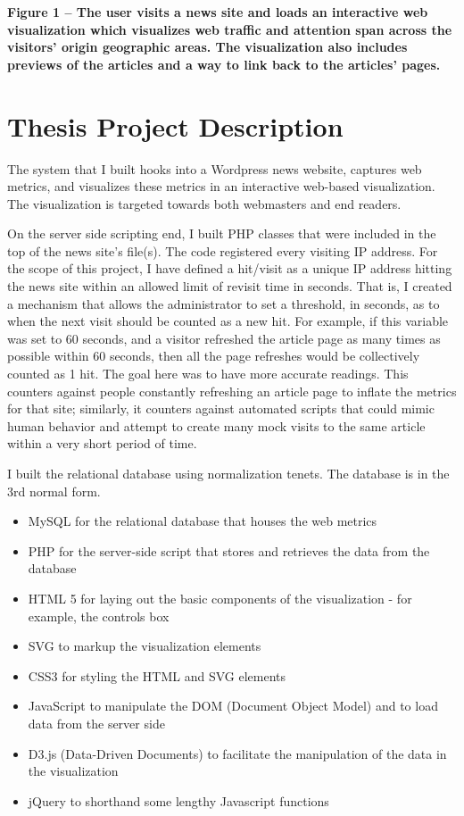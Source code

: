 \documentclass[12pt]{article}
\begin{document}
\noindent\textbf{Figure 1 -- The user visits a news site and loads an interactive web visualization which visualizes web traffic and attention span across the visitors' origin geographic areas. The visualization also includes previews of the articles and a way to link back to the articles' pages.}

\vfill

\section{Thesis Project Description}
The system that I built hooks into a Wordpress news website, captures web metrics, and visualizes these metrics in an interactive web-based visualization. The visualization is targeted towards both webmasters and end readers. 

On the server side scripting end, I built PHP classes that were included in the top of the news site's file(s). The code registered every visiting IP address. For the scope of this project, I have defined a hit/visit as a unique IP address hitting the news site within an allowed limit of revisit time in seconds. That is, I created a mechanism that allows the administrator to set a threshold, in seconds, as to when the next visit should be counted as a new hit. For example, if this variable was set to 60 seconds, and a visitor refreshed the article page as many times as possible within 60 seconds, then all the page refreshes would be collectively counted as 1 hit. The goal here was to have more accurate readings. This counters against people constantly refreshing an article page to inflate the metrics for that site; similarly, it counters against automated scripts that could mimic human behavior and attempt to create many mock visits to the same article within a very short period of time. 

I built the relational database using normalization tenets. The database is in the 3rd normal form.\\

\begin{itemize}
\item MySQL for the relational database that houses the web metrics
\item PHP for the server-side script that stores and retrieves the data from the database
\item HTML 5 for laying out the basic components of the visualization - for example, the controls box
\item SVG to markup the visualization elements
\item CSS3 for styling the HTML and SVG elements
\item JavaScript to manipulate the DOM (Document Object Model) and to load data from the server side
\item D3.js (Data-Driven Documents) to facilitate the manipulation of the data in the visualization
\item jQuery to shorthand some lengthy Javascript functions
\end{itemize}
\end{document}
